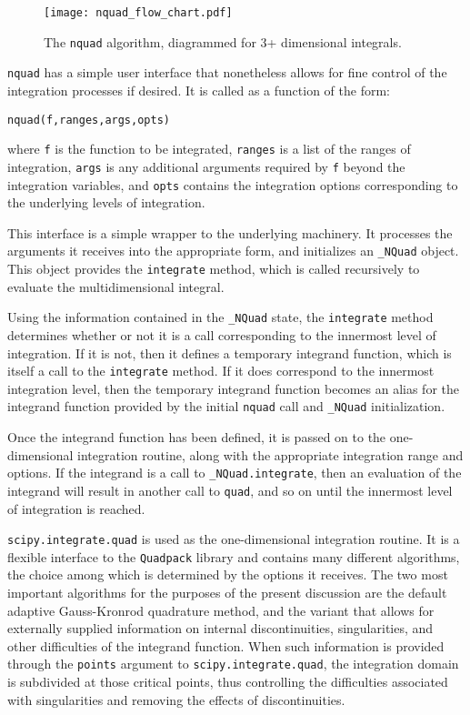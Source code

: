 \begin{figure}
\centering
\label{fig:nquad-flow-chart}
\texttt{[image: nquad\_flow\_chart.pdf]}
\caption{The {\tt nquad} algorithm, diagrammed for 3+ dimensional integrals.}
\end{figure}

{\tt nquad} has a simple user interface that nonetheless allows for fine control of the integration processes if desired. It is called as a function of the form:

{\tt nquad(f,ranges,args,opts)}

where {\tt f} is the function to be integrated, {\tt ranges} is a list of the ranges of integration, {\tt args} is any additional arguments required by {\tt f} beyond the integration variables, and {\tt opts} contains the integration options corresponding to the underlying levels of integration. 

This interface is a simple wrapper to the underlying machinery. It processes the arguments it receives into the appropriate form, and initializes an {\tt \_NQuad} object. This object provides the {\tt integrate} method, which is called recursively to evaluate the multidimensional integral. 

Using the information contained in the {\tt \_NQuad} state, the {\tt integrate} method determines whether or not it is a call corresponding to the innermost level of integration. If it is not, then it defines a temporary integrand function, which is itself a call to the {\tt integrate} method. If it does correspond to the innermost integration level, then the temporary integrand function becomes an alias for the integrand function provided by the initial {\tt nquad} call and {\tt \_NQuad} initialization. 

Once the integrand function has been defined, it is passed on to the one-dimensional integration routine, along with the appropriate integration range and options. If the integrand is a call to {\tt \_NQuad.integrate}, then an evaluation of the integrand will result in another call to {\tt quad}, and so on until the innermost level of integration is reached. 

{\tt scipy.integrate.quad} is used as the one-dimensional integration routine. It is a flexible interface to the {\tt Quadpack} library and contains many different algorithms, the choice among which is determined by the options it receives. The two most important algorithms for the purposes of the present discussion are the default adaptive Gauss-Kronrod quadrature method, and the variant that allows for externally supplied information on internal discontinuities, singularities, and other difficulties of the integrand function\cite{netlib}. When such information is provided through the {\tt points} argument to {\tt scipy.integrate.quad}, the integration domain is subdivided at those critical points, thus controlling the difficulties associated with singularities and removing the effects of discontinuities. 

